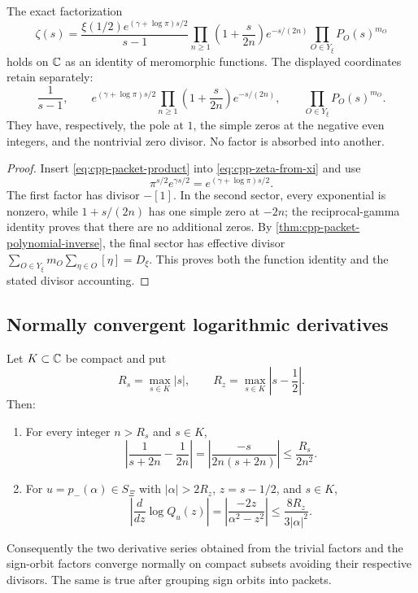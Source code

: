 \begin{theorem}
\label{thm:cpp-global-zeta-factorization}
The exact factorization
\begin{equation}
\label{eq:cpp-global-zeta-factorization}
 \zeta(s)
 =
 \frac{\xi(1/2)e^{(\gamma+\log\pi)s/2}}{s-1}
 \prod_{n\geq1}
 \left(1+\frac{s}{2n}\right)e^{-s/(2n)}
 \prod_{O\in Y_\xi}P_O(s)^{m_O}
\end{equation}
holds on \(\mathbb C\) as an identity of meromorphic functions.  The displayed
coordinates retain separately:
\[
 \frac1{s-1},
 \qquad
 e^{(\gamma+\log\pi)s/2}
 \prod_{n\geq1}
 \left(1+\frac{s}{2n}\right)e^{-s/(2n)},
 \qquad
 \prod_{O\in Y_\xi}P_O(s)^{m_O}.
\]
They have, respectively, the pole at \(1\), the simple zeros at the negative
even integers, and the nontrivial zero divisor.  No factor is absorbed into
another.
\end{theorem}

\begin{proof}
Insert \eqref{eq:cpp-packet-product} into
\eqref{eq:cpp-zeta-from-xi} and use
\[
 \pi^{s/2}e^{\gamma s/2}
 =
 e^{(\gamma+\log\pi)s/2}.
\]
The first factor has divisor \(-[1]\).  In the second sector, every exponential
is nonzero, while \(1+s/(2n)\) has one simple zero at \(-2n\); the
reciprocal-gamma identity proves that there are no additional zeros.  By
\cref{thm:cpp-packet-polynomial-inverse}, the final sector has effective
divisor
\(\sum_{O\in Y_\xi}m_O\sum_{\eta\in O}[\eta]=D_\xi\).
This proves both the function identity and the stated divisor accounting.
\end{proof}

\subsection{Normally convergent logarithmic derivatives}

\begin{lemma}
\label{lem:cpp-log-derivative-bounds}
Let \(K\subset\mathbb C\) be compact and put
\[
 R_s=\max_{s\in K}|s|,
 \qquad
 R_z=\max_{s\in K}\left|s-\frac12\right|.
\]
Then:
\begin{enumerate}
\item For every integer \(n>R_s\) and \(s\in K\),
\begin{equation}
\label{eq:cpp-gamma-derivative-bound}
 \left|
 \frac1{s+2n}-\frac1{2n}
 \right|
 =
 \left|\frac{-s}{2n(s+2n)}\right|
 \leq
 \frac{R_s}{2n^2}.
\end{equation}
\item For \(u=p_-(\alpha)\in S_\Xi\) with
\(|\alpha|>2R_z\), \(z=s-1/2\), and \(s\in K\),
\begin{equation}
\label{eq:cpp-packet-derivative-bound}
 \left|
 \frac{d}{dz}\log Q_u(z)
 \right|
 =
 \left|\frac{-2z}{\alpha^2-z^2}\right|
 \leq
 \frac{8R_z}{3|\alpha|^2}.
\end{equation}
\end{enumerate}
Consequently the two derivative series obtained from the trivial factors and
the sign-orbit factors converge normally on compact subsets avoiding their
respective divisors.  The same is true after grouping sign orbits into
packets.
\end{lemma}

